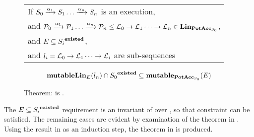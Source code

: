 \begin{figure}
  \begin{tabular}{l}
    If \(S_0 \xrightarrow {\alpha_1} S_1 \dots \xrightarrow {\alpha_{n}} S_{n}\) is an execution, \\
    and \(\mathcal{P}_0 \xrightarrow {\alpha_1} \mathcal{P}_1 \dots \xrightarrow {\alpha_{n}} \mathcal{P}_{n} \leq \mathcal{L}_0 \rightarrow \mathcal{L}_1 \dots \rightarrow \mathcal{L}_{n} \in \mathbf{Lin}_{\mathbf{PotAcc}_{S_0}}\), \\
    and \(E \subseteq {S_i}^{\mathbf{existed}}\), \\
    and \( l_i = \mathcal{L}_0 \rightarrow \mathcal{L}_1 \dots \rightarrow \mathcal{L}_{i}\) are sub-sequences
  \end{tabular}
\[
\mathbf{mutableLin}_{E}(l_n) \cap {S_0}^{\mathbf{existed}} \subseteq \mathbf{mutable}_{\mathbf{PotAcc}_{S_0}}(E)
\]
\caption{Theorem: \mutableLineage{} is \mutable{}. \label{SW:thm:mutableLineage:Lin}}
\end{figure}

The \(E \subseteq {S_i}^{\mathbf{existed}}\) requirement is an invariant of \mutableLineage{} over \lineage{}, so that constraint can be satisfied.
The remaining cases are evident by examination of the theorem in .
Using the result in  as an induction step, the theorem in  is produced.


